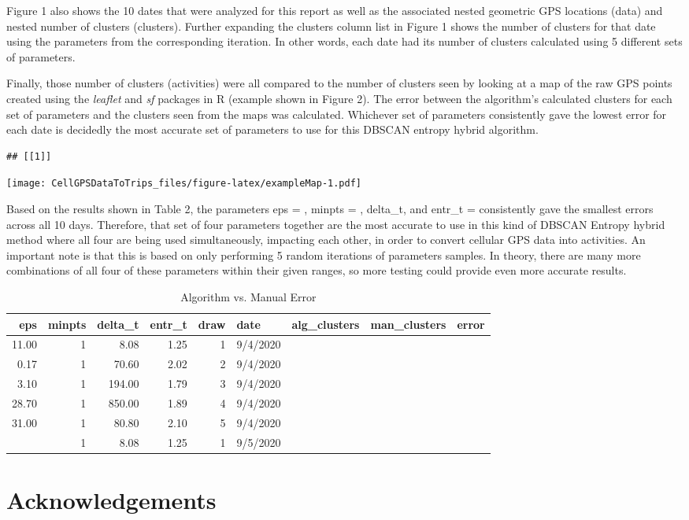 \documentclass[3p, authoryear]{elsarticle} %
\begin{document}
Figure 1 also shows the 10 dates that were analyzed for this report as well as the associated nested geometric GPS locations (data) and nested number of clusters (clusters). Further expanding the clusters column list in Figure 1 shows the number of clusters for that date using the parameters from the corresponding iteration. In other words, each date had its number of clusters calculated using 5 different sets of parameters.

Finally, those number of clusters (activities) were all compared to the number of clusters seen by looking at a map of the raw GPS points created using the \emph{leaflet} and \emph{sf} packages in R (example shown in Figure 2). The error between the algorithm's calculated clusters for each set of parameters and the clusters seen from the maps was calculated. Whichever set of parameters consistently gave the lowest error for each date is decidedly the most accurate set of parameters to use for this DBSCAN entropy hybrid algorithm.

\begin{verbatim}
## [[1]]
\end{verbatim}

\texttt{[image: CellGPSDataToTrips\_files/figure-latex/exampleMap-1.pdf]}

Based on the results shown in Table 2, the parameters eps = , minpts = , delta\_t, and entr\_t = consistently gave the smallest errors across all 10 days. Therefore, that set of four parameters together are the most accurate to use in this kind of DBSCAN Entropy hybrid method where all four are being used simultaneously, impacting each other, in order to convert cellular GPS data into activities. An important note is that this is based on only performing 5 random iterations of parameters samples. In theory, there are many more combinations of all four of these parameters within their given ranges, so more testing could provide even more accurate results.

\begin{longtable}[t]{rrrrrllll}
\caption{\label{tab:exampleError}Algorithm vs. Manual Error}\\
\toprule
eps & minpts & delta\_t & entr\_t & draw & date & alg\_clusters & man\_clusters & error\\
\midrule
11.00 & 1 & 8.08 & 1.25 & 1 & 9/4/2020 &  &  & \\
0.17 & 1 & 70.60 & 2.02 & 2 & 9/4/2020 &  &  & \\
3.10 & 1 & 194.00 & 1.79 & 3 & 9/4/2020 &  &  & \\
28.70 & 1 & 850.00 & 1.89 & 4 & 9/4/2020 &  &  & \\
31.00 & 1 & 80.80 & 2.10 & 5 & 9/4/2020 &  &  & \\
\addlinespace
11.00 & 1 & 8.08 & 1.25 & 1 & 9/5/2020 &  &  & \\
\bottomrule
\end{longtable}

\hypertarget{acknowledgements}{%
\section*{Acknowledgements}\label{acknowledgements}}


\end{document}
